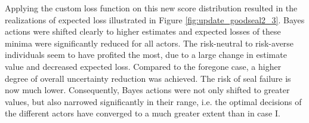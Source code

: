 				Applying the custom loss function on this new score distribution resulted in the realizations of expected loss illustrated in Figure \ref{fig:update_goodseal2_3}. Bayes actions were shifted clearly to higher estimates and expected losses of these minima were significantly reduced for all actors. The risk-neutral to risk-averse individuals seem to have profited the most, due to a large change in estimate value and decreased expected loss. Compared to the foregone case, a higher degree of overall uncertainty reduction was achieved. The risk of seal failure is now much lower. Consequently, Bayes actions were not only shifted to greater values, but also narrowed significantly in their range, i.e. the optimal decisions of the different actors have converged to a much greater extent than in case I.\\		
				
